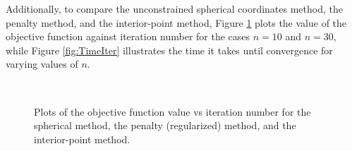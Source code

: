 \documentclass[11pt]{article}
\begin{document}
Additionally, to compare the unconstrained spherical coordinates method, the penalty method, and the interior-point method, Figure \ref{fig:ObjIter} plots the value of the objective function against iteration number for the cases $n=10$ and $n=30$, while Figure \ref{fig:TimeIter} illustrates the time it takes until convergence for varying values of $n$.

\begin{figure}[!htbp]
  \centering
   \\
  \caption{Plots of the objective function value vs iteration number for the spherical method, the penalty (regularized) method, and the interior-point method.}
  \label{fig:ObjIter}
\end{figure}
\end{document}
